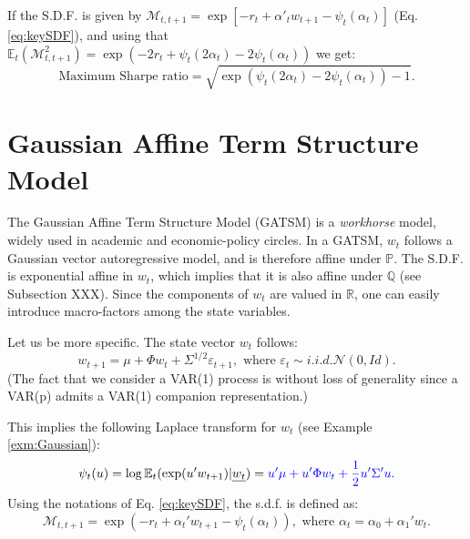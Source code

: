 \documentclass[
  12pt,
]{book}
\theoremstyle{definition}
\theoremstyle{definition}
\theoremstyle{definition}
\theoremstyle{definition}
\theoremstyle{remark}
\begin{document}
If the S.D.F. is given by \(\mathcal{M}_{t,t+1} = \exp[-r_{t}+\alpha'_tw_{t+1}-\psi_t(\alpha_t)]\) (Eq. \eqref{eq:keySDF}), and using that \(\mathbb{E}_t(\mathcal{M}_{t,t+1}^2)=\exp(-2r_t+\psi_t(2\alpha_t)-2\psi_t(\alpha_t))\) we get:
\[
\mbox{Maximum Sharpe ratio} = \sqrt{\exp(\psi_t(2\alpha_t)-2\psi_t(\alpha_t)) - 1}.
\]

\hypertarget{RiskFreeGaussian}{%
\section{Gaussian Affine Term Structure Model}\label{RiskFreeGaussian}}

The Gaussian Affine Term Structure Model (GATSM) is a \emph{workhorse} model, widely used in academic and economic-policy circles. In a GATSM, \(w_t\) follows a Gaussian vector autoregressive model, and is therefore affine under \(\mathbb{P}\). The S.D.F. is exponential affine in \(w_t\), which implies that it is also affine under \(\mathbb{Q}\) (see Subsection XXX). Since the components of \(w_t\) are valued in \(\mathbb{R}\), one can easily introduce macro-factors among the state variables.

Let us be more specific. The state vector \(w_t\) follows:
\begin{equation}
w_{t+1} = \mu + \Phi w_{t} + \Sigma^{1/2} \varepsilon_{t+1}, \mbox{ where } \varepsilon_{t} \sim  i.i.d. \mathcal{N}(0,Id).\label{eq:GaussianVAR1}
\end{equation}
(The fact that we consider a VAR(1) process is without loss of generality since a VAR(p) admits a VAR(1) companion representation.)

This implies the following Laplace transform for \(w_t\) (see Example \ref{exm:Gaussian}):
\[
\psi_t(u) = \log \mathbb{E}_t(\exp(u'w_{t+1})|\underline{w_t}) = \color{blue}{u'\mu + u'\Phi w_t + \frac{1}{2}u'\Sigma'u}.
\]
Using the notations of Eq. \eqref{eq:keySDF}, the s.d.f. is defined as:
\[
\mathcal{M}_{t,t+1} = \exp(- r_t + \alpha_t'w_{t+1} - \psi_t(\alpha_t)), \mbox{ where } \alpha_t = \alpha_0 + \alpha_1'w_t.
\]
\end{document}
